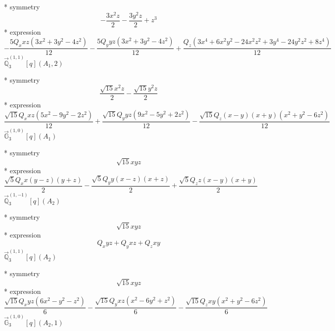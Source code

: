\documentclass[fleqn,8pt]{jsarticle}
\begin{document}
\noindent\quad ** symmetry
\begin{dmath*}
- \frac{3 x^{2} z}{2} - \frac{3 y^{2} z}{2} + z^{3}
\end{dmath*}
\noindent\quad ** expression
\begin{dmath*}
- \frac{5 Q_{x} x z \left(3 x^{2} + 3 y^{2} - 4 z^{2}\right)}{12} - \frac{5 Q_{y} y z \left(3 x^{2} + 3 y^{2} - 4 z^{2}\right)}{12} + \frac{Q_{z} \left(3 x^{4} + 6 x^{2} y^{2} - 24 x^{2} z^{2} + 3 y^{4} - 24 y^{2} z^{2} + 8 z^{4}\right)}{12}
\end{dmath*}
\noindent\quad $\vec{\mathbb{Q}}_{3}^{(1,1)}[q](A_{1},2)$

\noindent\quad ** symmetry
\begin{dmath*}
\frac{\sqrt{15} x^{2} z}{2} - \frac{\sqrt{15} y^{2} z}{2}
\end{dmath*}
\noindent\quad ** expression
\begin{dmath*}
\frac{\sqrt{15} Q_{x} x z \left(5 x^{2} - 9 y^{2} - 2 z^{2}\right)}{12} + \frac{\sqrt{15} Q_{y} y z \left(9 x^{2} - 5 y^{2} + 2 z^{2}\right)}{12} - \frac{\sqrt{15} Q_{z} \left(x - y\right) \left(x + y\right) \left(x^{2} + y^{2} - 6 z^{2}\right)}{12}
\end{dmath*}
\noindent\quad $\vec{\mathbb{G}}_{3}^{(1,0)}[q](A_{1})$

\noindent\quad ** symmetry
\begin{dmath*}
\sqrt{15} x y z
\end{dmath*}
\noindent\quad ** expression
\begin{dmath*}
\frac{\sqrt{5} Q_{x} x \left(y - z\right) \left(y + z\right)}{2} - \frac{\sqrt{5} Q_{y} y \left(x - z\right) \left(x + z\right)}{2} + \frac{\sqrt{5} Q_{z} z \left(x - y\right) \left(x + y\right)}{2}
\end{dmath*}
\noindent\quad $\vec{\mathbb{Q}}_{3}^{(1,-1)}[q](A_{2})$

\noindent\quad ** symmetry
\begin{dmath*}
\sqrt{15} x y z
\end{dmath*}
\noindent\quad ** expression
\begin{dmath*}
Q_{x} y z + Q_{y} x z + Q_{z} x y
\end{dmath*}
\noindent\quad $\vec{\mathbb{Q}}_{3}^{(1,1)}[q](A_{2})$

\noindent\quad ** symmetry
\begin{dmath*}
\sqrt{15} x y z
\end{dmath*}
\noindent\quad ** expression
\begin{dmath*}
\frac{\sqrt{15} Q_{x} y z \left(6 x^{2} - y^{2} - z^{2}\right)}{6} - \frac{\sqrt{15} Q_{y} x z \left(x^{2} - 6 y^{2} + z^{2}\right)}{6} - \frac{\sqrt{15} Q_{z} x y \left(x^{2} + y^{2} - 6 z^{2}\right)}{6}
\end{dmath*}
\noindent\quad $\vec{\mathbb{G}}_{3}^{(1,0)}[q](A_{2},1)$
\end{document}

